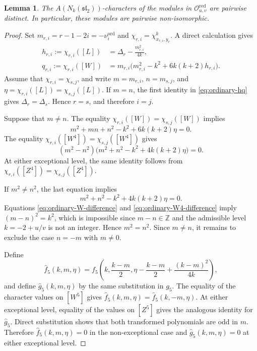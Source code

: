 \documentclass[11 pt]{amsart}
\newtheorem{lemma}{Lemma}
\theoremstyle{definition}
\theoremstyle{plain}
\begin{document}
\begin{lemma}\label{lem:ordinary-characters-distinct}
The $A(N_k(\mathfrak{sl}_2))$-characters of the modules in
$\mathcal O^{\mathrm{red}}_{u,v}$ are pairwise distinct.  In particular,
these modules are pairwise non-isomorphic.
\end{lemma}





\begin{proof}
Set $m_{r,i}=r-1-2i=-\nu_i^{\mathrm{ord}}$ and
$\chi_{r,i}=\chi^k_{x_{r,i},y_r}$.
A direct calculation gives
\begin{equation}\label{eq:ordinary-hq}
\begin{aligned}
  h_{r,i}:=\chi_{r,i}([L])
  &=\Delta_r-\frac{m_{r,i}^2}{4k},\\
  q_{r,i}:=\chi_{r,i}([W])
  &=m_{r,i}\bigl(m_{r,i}^2-k^2
  +6k(k+2)h_{r,i}\bigr).
\end{aligned}
\end{equation}
Assume that $\chi_{r,i}=\chi_{s,j}$, and write
$m=m_{r,i}$, $n=m_{s,j}$, and
$\eta=\chi_{r,i}([L])=\chi_{s,j}([L])$.
If $m=n$, the first identity in \eqref{eq:ordinary-hq} gives
$\Delta_r=\Delta_s$. Hence $r=s$, and therefore $i=j$.

Suppose that $m\neq n$. The equality
$\chi_{r,i}([W])=\chi_{s,j}([W])$ implies
\begin{equation}\label{eq:ordinary-W-difference}
  m^2+mn+n^2-k^2+6k(k+2)\eta=0.
\end{equation}
The equality
$\chi_{r,i}([W^4])=\chi_{s,j}([W^4])$ gives
\begin{equation} \label{eq:ordinary-W4-Z4-difference}
(m^2-n^2)\bigl(m^2+n^2-k^2+4k(k+2)\eta\bigr)=0.
\end{equation}
At either exceptional level, the same identity follows from
$\chi_{r,i}([Z^4])=\chi_{s,j}([Z^4])$.

If $m^2\neq n^2$, the last equation implies
\begin{equation}\label{eq:ordinary-W4-difference}
  m^2+n^2-k^2+4k(k+2)\eta=0.
\end{equation}
Equations \eqref{eq:ordinary-W-difference} and
\eqref{eq:ordinary-W4-difference} imply $(m-n)^2=k^2$,
which is impossible since $m-n\in\mathbb Z$ and the admissible level
$k=-2+u/v$ is not an integer. Hence $m^2=n^2$. Since $m\neq n$, it
remains to exclude the case $n=-m$ with $m\neq0$.

Define
\[
\widehat f_5(k,m,\eta)
=f_5\left(
k,\frac{k-m}{2},
\eta-\frac{k-m}{2}+\frac{(k-m)^2}{4k}
\right),
\]
and define $\widehat g_5(k,m,\eta)$ by the same substitution in $g_5$.
The equality of the character values on $[W^5]$ gives
$\widehat f_5(k,m,\eta)=\widehat f_5(k,-m,\eta)$.
At either exceptional level, equality of the values on $[Z^5]$ gives
the analogous identity for $\widehat g_5$. Direct substitution shows that
both transformed polynomials are odd in $m$. Therefore
$\widehat f_5(k,m,\eta)=0$ in the non-exceptional case and
$\widehat g_5(k,m,\eta)=0$ at either exceptional level.


\end{proof}
\end{document}
